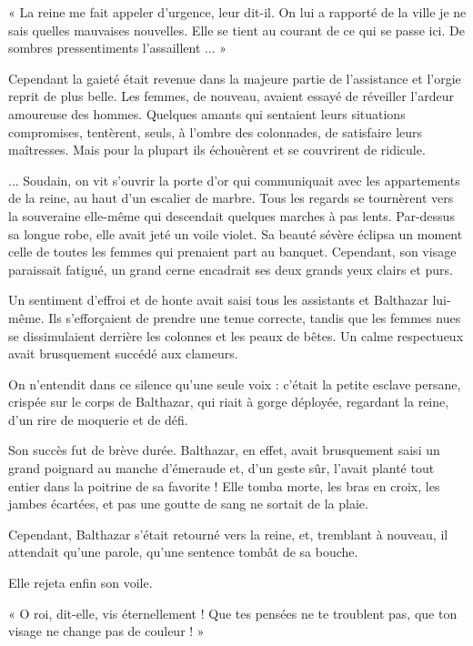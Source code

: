\documentclass[a4paper, 11pt, oneside, polutonikogreek, french]{article}
\begin{document}
« La reine me fait appeler d'urgence, leur dit-il. On lui a rapporté de la ville je ne sais quelles mauvaises nouvelles. Elle se tient au courant de ce qui se passe ici. De sombres pressentiments l'assaillent ... »

Cependant la gaieté était revenue dans la majeure partie de l'assistance et l'orgie reprit de plus belle. Les femmes, de nouveau, avaient essayé de réveiller l'ardeur amoureuse des hommes. Quelques amants qui sentaient leurs situations compromises, tentèrent, seuls, à l'ombre des colonnades, de satisfaire leurs maîtresses. Mais pour la plupart ils échouèrent et se couvrirent de ridicule.

\bigskip
\centerline{\EightStarTaper}
\centerline{\EightStarTaper\EightStarTaper}
\bigskip

... Soudain, on vit s'ouvrir la porte d'or qui communiquait avec les appartements de la reine, au haut d'un escalier de marbre. Tous les regards se tournèrent vers la souveraine elle-même qui descendait quelques marches à pas lents. Par-dessus sa longue robe, elle avait jeté un voile violet. Sa beauté sévère éclipsa un moment celle de toutes les femmes qui prenaient part au banquet. Cependant, son visage paraissait fatigué, un grand cerne encadrait ses deux grands yeux clairs et purs.

Un sentiment d'effroi et de honte avait saisi tous les assistants et Balthazar lui-même. Ils s'efforçaient de prendre une tenue correcte, tandis que les femmes nues se dissimulaient derrière les colonnes et les peaux de bêtes. Un calme respectueux avait brusquement succédé aux clameurs.

On n'entendit dans ce silence qu'une seule voix : c'était la petite esclave persane, crispée sur le corps de Balthazar, qui riait à gorge déployée, regardant la reine, d'un rire de moquerie et de défi.

Son succès fut de brève durée. Balthazar, en effet, avait brusquement saisi un grand poignard au manche d'émeraude et, d'un geste sûr, l'avait planté tout entier dans la poitrine de sa favorite ! Elle tomba morte, les bras en croix, les jambes écartées, et pas une goutte de sang ne sortait de la plaie.

Cependant, Balthazar s'était retourné vers la reine, et, tremblant à nouveau, il attendait qu'une parole, qu'une sentence tombât de sa bouche.

Elle rejeta enfin son voile.

« O roi, dit-elle, vis éternellement ! Que tes pensées ne te troublent pas, que ton visage ne change pas de couleur ! »
\end{document}
